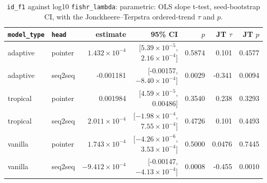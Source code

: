 \documentclass[10pt]{article}
\begin{document}
{\small
\begin{longtable}{llrrrrr}
\caption{\texttt{id\_f1} against log10 \texttt{fishr\_lambda}: parametric: OLS slope t-test, seed-bootstrap CI, with the Jonckheere--Terpstra ordered-trend $\tau$ and $p$.}\label{tab:trend-id_f1}\\
\toprule
\texttt{model\_type} & \texttt{head} & estimate & 95\% CI & $p$ & JT $\tau$ & JT $p$\\
\midrule
\endhead
adaptive & pointer & $1.432\times10^{-4}$ & [$5.39\times10^{-5}$, $2.16\times10^{-4}$] & 0.5874 & 0.101 & 0.4577\\
adaptive & seq2seq & -0.001181 & [-0.00157, $-8.40\times10^{-4}$] & 0.0029 & -0.341 & 0.0094\\
tropical & pointer & 0.001984 & [$4.59\times10^{-5}$, 0.00486] & 0.3540 & 0.238 & 0.3293\\
tropical & seq2seq & $2.011\times10^{-4}$ & [$-1.98\times10^{-4}$, $7.55\times10^{-4}$] & 0.4726 & 0.101 & 0.4493\\
vanilla & pointer & $1.743\times10^{-4}$ & [$-4.26\times10^{-6}$, $3.53\times10^{-4}$] & 0.5000 & 0.0476 & 0.7445\\
vanilla & seq2seq & $-9.412\times10^{-4}$ & [-0.00147, $-4.13\times10^{-4}$] & 0.0008 & -0.455 & 0.0010\\
\bottomrule
\end{longtable}
}
\end{document}
